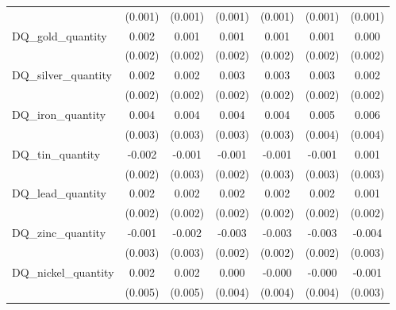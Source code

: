 \begin{table}[htbp]
\begin{tabular}{l*{6}{c}}
            &     (0.001)       &     (0.001)       &     (0.001)       &     (0.001)       &     (0.001)       &     (0.001)       \\
[1em]
DQ\_gold\_quantity&       0.002       &       0.001       &       0.001       &       0.001       &       0.001       &       0.000       \\
            &     (0.002)       &     (0.002)       &     (0.002)       &     (0.002)       &     (0.002)       &     (0.002)       \\
[1em]
DQ\_silver\_quantity&       0.002       &       0.002       &       0.003       &       0.003       &       0.003       &       0.002       \\
            &     (0.002)       &     (0.002)       &     (0.002)       &     (0.002)       &     (0.002)       &     (0.002)       \\
[1em]
DQ\_iron\_quantity&       0.004       &       0.004       &       0.004       &       0.004       &       0.005       &       0.006       \\
            &     (0.003)       &     (0.003)       &     (0.003)       &     (0.003)       &     (0.004)       &     (0.004)       \\
[1em]
DQ\_tin\_quantity&      -0.002       &      -0.001       &      -0.001       &      -0.001       &      -0.001       &       0.001       \\
            &     (0.002)       &     (0.003)       &     (0.002)       &     (0.003)       &     (0.003)       &     (0.003)       \\
[1em]
DQ\_lead\_quantity&       0.002       &       0.002       &       0.002       &       0.002       &       0.002       &       0.001       \\
            &     (0.002)       &     (0.002)       &     (0.002)       &     (0.002)       &     (0.002)       &     (0.002)       \\
[1em]
DQ\_zinc\_quantity&      -0.001       &      -0.002       &      -0.003       &      -0.003       &      -0.003       &      -0.004       \\
            &     (0.003)       &     (0.003)       &     (0.002)       &     (0.002)       &     (0.002)       &     (0.003)       \\
[1em]
DQ\_nickel\_quantity&       0.002       &       0.002       &       0.000       &      -0.000       &      -0.000       &      -0.001       \\
            &     (0.005)       &     (0.005)       &     (0.004)       &     (0.004)       &     (0.004)       &     (0.003)       \\

\end{tabular}
\end{table}
